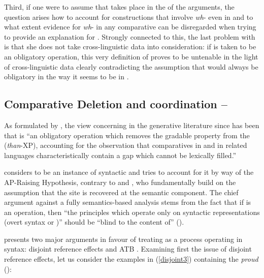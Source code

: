 Third, if one were to assume that  takes place in the  of the arguments, the question arises how to account for constructions that involve \textit{wh}- even in  and to what extent evidence for \textit{wh}- in any comparative  can be disregarded when trying to provide an explanation for . Strongly connected to this, the last problem with \citet{bresnan1973} is that she does not take cross-linguistic data into consideration: if  is taken to be an obligatory operation, this very definition of  proves to be untenable in the light of cross-linguistic data clearly contradicting the assumption that  would always be obligatory in the way it seems to be in .

\subsection{Comparative Deletion and coordination -- \citet{lechner1999diss, lechner2004}} \label{sec:3coordination}
As formulated by \citet[9]{lechner2004}, the view concerning  in the generative literature since \citet{bresnan1973, bresnan1975, bresnan1977} has been that  is ``an obligatory operation which removes the gradable property from the  (\textit{than}-XP), accounting for the observation that comparatives in  and in related languages characteristically contain a gap which cannot be lexically filled.''

\citet[9]{lechner2004} considers  to be an instance of syntactic  and tries to account for it by way of the AP-Raising Hypothesis, contrary to \citet{lernerpinkal1992, lernerpinkal1995} and \citet{kennedy1997diss, kennedy1999}, who fundamentally build on the assumption that the  site is recovered at the semantic component. The chief argument against a fully semantics-based analysis stems from the fact that if  is an  operation, then ``the principles which operate only on syntactic representations (overt syntax or )'' should be ``blind to the content of''  (\citealt[14]{lechner2004}).

\citet[14--21]{lechner2004} presents two major arguments in favour of treating  as a process operating in syntax: disjoint reference effects and ATB . Examining first the issue of disjoint reference effects, let us consider the examples in (\ref{disjoint3}) containing the  \textit{proud} (\citealt[14, ex.20]{lechner2004}):

